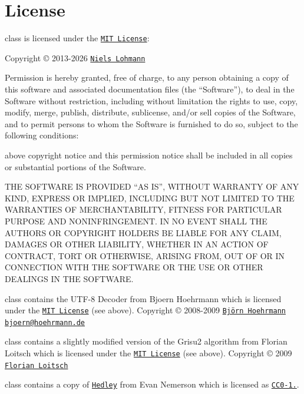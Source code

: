 \chapter{License }
\hypertarget{md_include_2nlohman_2json-develop_2docs_2mkdocs_2docs_2home_2license}{}\label{md_include_2nlohman_2json-develop_2docs_2mkdocs_2docs_2home_2license}
\label{md_include_2nlohman_2json-develop_2docs_2mkdocs_2docs_2home_2license_autotoc_md1658}%
%




 class is licensed under the \href{https://opensource.org/licenses/MIT}{\texttt{MIT License}}:\+

Copyright \copyright{} 2013-\/2026 \href{https://nlohmann.me}{\texttt{Niels Lohmann}}

Permission is hereby granted, free of charge, to any person obtaining a copy of this software and associated documentation files (the “\+Software”), to deal in the Software without restriction, including without limitation the rights to use, copy, modify, merge, publish, distribute, sublicense, and/\+or sell copies of the Software, and to permit persons to whom the Software is furnished to do so, subject to the following conditions:\+

 above copyright notice and this permission notice shall be included in all copies or substantial portions of the Software.

THE SOFTWARE IS PROVIDED “\+AS IS”, WITHOUT WARRANTY OF ANY KIND, EXPRESS OR IMPLIED, INCLUDING BUT NOT LIMITED TO THE WARRANTIES OF MERCHANTABILITY, FITNESS FOR  PARTICULAR PURPOSE AND NONINFRINGEMENT. IN NO EVENT SHALL THE AUTHORS OR COPYRIGHT HOLDERS BE LIABLE FOR ANY CLAIM, DAMAGES OR OTHER LIABILITY, WHETHER IN AN ACTION OF CONTRACT, TORT OR OTHERWISE, ARISING FROM, OUT OF OR IN CONNECTION WITH THE SOFTWARE OR THE USE OR OTHER DEALINGS IN THE SOFTWARE.



 class contains the UTF-\/8 Decoder from Bjoern Hoehrmann which is licensed under the \href{https://opensource.org/licenses/MIT}{\texttt{MIT License}} (see above). Copyright \copyright{} 2008-\/2009 \href{http://bjoern.hoehrmann.de/}{\texttt{Björn Hoehrmann}} \href{mailto:bjoern@hoehrmann.de}{\texttt{bjoern@hoehrmann.\+de}}

 class contains a slightly modified version of the Grisu2 algorithm from Florian Loitsch which is licensed under the \href{https://opensource.org/licenses/MIT}{\texttt{MIT License}} (see above). Copyright \copyright{} 2009 \href{https://florian.loitsch.com/}{\texttt{Florian Loitsch}}

 class contains a copy of \href{https://nemequ.github.io/hedley/}{\texttt{Hedley}} from Evan Nemerson which is licensed as \href{https://creativecommons.org/publicdomain/zero/1.0/}{\texttt{CC0-\/1.}}. 